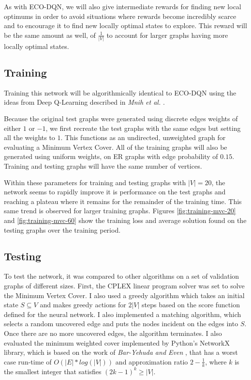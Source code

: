 \documentclass{article}
\begin{document}
As with ECO-DQN, we will also give intermediate rewards for finding new local optimums in order to avoid situations where rewards become incredibly scarce and to encourage it to find new locally optimal states to explore. This reward will be the same amount as well, of $\frac{1}{|V|}$ to account for larger graphs having more locally optimal states.

\subsection{Training}\label{sec:training-mvc}

Training this network will be algorithmically identical to ECO-DQN \cite{eco-dqn} using the ideas from Deep Q-Learning described in \textit{Mnih et al.} \cite{deepmind_2015}.

Because the original test graphs were generated using discrete edges weights of either $1$ or $-1$, we first recreate the test graphs with the same edges but setting all the weights to $1$. This functions as an undirected, unweighted graph for evaluating a Minimum Vertex Cover. All of the training graphs will also be generated using uniform weights, on ER graphs with edge probability of $0.15$. Training and testing graphs will have the same number of vertices.

Within these parameters for training and testing graphs with $|V| = 20$, the network seems to rapidly improve it is performance on the test graphs and reaching a plateau where it remains for the remainder of the training time. This same trend is observed for larger training graphs. Figures \ref{fig:training-mvc-20} and \ref{fig:training-mvc-60} show the training loss and average solution found on the testing graphs over the training period.


\subsection{Testing}\label{sec:testing-mvc}

To test the network, it was compared to other algorithms on a set of validation graphs of different sizes. First, the CPLEX linear program solver was set to solve the Minimum Vertex Cover. I also used a greedy algorithm which takes an initial state $S \subseteq V$ and makes greedy actions for $2|V|$ steps based on the score function defined for the neural network. I also implemented a matching algorithm, which selects a random uncovered edge and puts the nodes incident on the edges into $S$. Once there are no more uncovered edges, the algorithm terminates. I also evaluated the minimum weighted cover implemented by Python's NetworkX library, which is based on the work of \textit{Bar-Yehuda and Even} \cite{min-weighted-cover-bar}, that has a worst case run-time of $O(|E| * log(|V|))$ and approximation ratio $2 - \frac{1}{k}$, where $k$ is the smallest integer that satisfies $(2k - 1)^k \ge |V|$. 
\end{document}
